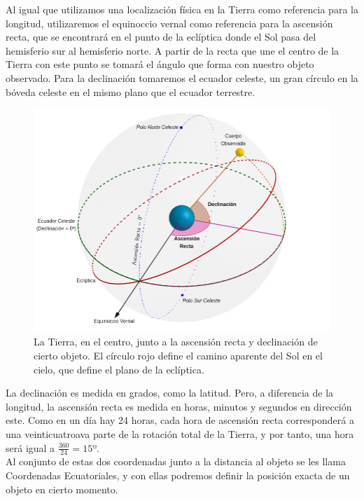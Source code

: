 \documentclass[11pt]{article}
\begin{document}
Al igual que utilizamos una localización física en la Tierra como referencia para la longitud, utilizaremos el equinoccio vernal como referencia para la ascensión recta, que se encontrará en el punto de la eclíptica donde el Sol pasa del hemisferio sur al hemisferio norte. A partir de la recta que une el centro de la Tierra con este punto se tomará el ángulo que forma con nuestro objeto observado. Para la declinación tomaremos el ecuador celeste, un gran círculo en la bóveda celeste en el mismo plano que el ecuador terrestre.\\

\begin{figure}[H]
\centering
\includegraphics[scale=0.4]{images/ascension_declinacion.png}
\caption{La Tierra, en el centro, junto a la ascensión recta y declinación de cierto objeto. El círculo rojo define el camino aparente del Sol en el cielo, que define el plano de la eclíptica.}
\label{fig:ascension_declinacion}
\end{figure}

La declinación es medida en grados, como la latitud. Pero, a diferencia de la longitud, la ascensión recta es medida en horas, minutos y segundos en dirección este. Como en un día hay 24 horas, cada hora de ascensión recta corresponderá a una veinticuatroava parte de la rotación total de la Tierra, y por tanto, una hora será igual a $\frac{360}{24}=15º$.\\

Al conjunto de estas dos coordenadas junto a la distancia al objeto se les llama Coordenadas Ecuatoriales, y con ellas podremos definir la posición exacta de un objeto en cierto momento.\\
\end{document}
